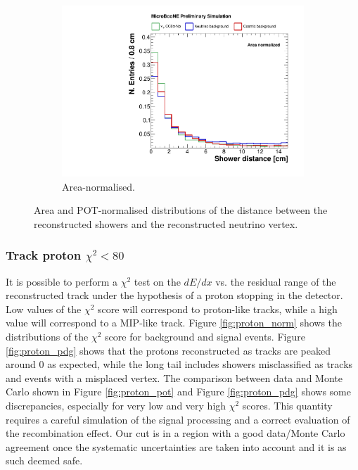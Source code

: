 \begin{figure}[htbp]
\begin{subfigure}{0.49\textwidth}
    \includegraphics[width=\linewidth]{figures/h_shower_distance_norm.pdf}
    \caption{Area-normalised.} \label{fig:showerd_norm}
  \end{subfigure}
  \caption{Area and POT-normalised distributions of the distance between the reconstructed showers and the reconstructed neutrino vertex.}
\end{figure}

\subsubsection*{Track proton $\chi^2 < 80$}
It is possible to perform a $\chi^2$ test on the $dE/dx$ vs. the residual range of the reconstructed track under the hypothesis of a proton stopping in the detector. Low values of the $\chi^2$ score will correspond to proton-like tracks, while a high value will correspond to a MIP-like track. Figure \ref{fig:proton_norm} shows the distributions of the $\chi^2$ score for background and signal events. Figure \ref{fig:proton_pdg} shows that the protons reconstructed as tracks are peaked around 0 as expected, while the long tail includes showers misclassified as tracks and events with a misplaced vertex. The comparison between data and Monte Carlo shown in Figure \ref{fig:proton_pot} and Figure \ref{fig:proton_pdg} shows some discrepancies, especially for very low and very high $\chi^2$ scores. This quantity requires a careful simulation of the signal processing and a correct evaluation of the recombination effect. Our cut is in a region with a good data/Monte Carlo agreement once the systematic uncertainties are taken into account and it is as such deemed safe.

